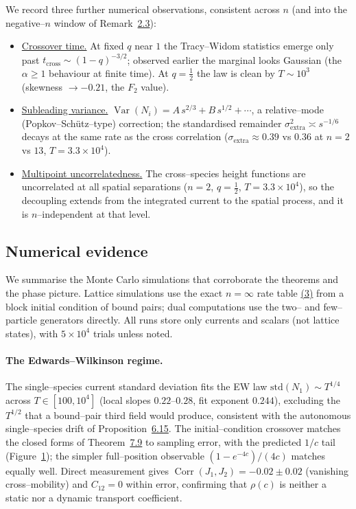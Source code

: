 \documentclass[11pt]{article}
\theoremstyle{plain}
\theoremstyle{definition}
\theoremstyle{remark}
\DeclareMathOperator{\Var}{Var}\DeclareMathOperator{\Cov}{Cov}
\DeclareMathOperator{\Corr}{Corr}\DeclareMathOperator{\cum}{cum}
\begin{document}
We record three further numerical observations, consistent across $n$ (and into the
negative--$n$ window of Remark~\hyperref[rem_range]{2.3}):
\begin{itemize}
\item \underline{Crossover time.} At fixed $q$ near $1$ the Tracy--Widom statistics emerge only
past $t_{\mathrm{cross}}\sim(1-q)^{-3/2}$; observed earlier the marginal looks Gaussian
(the $\alpha\ge1$ behaviour at finite time). At $q=\tfrac12$ the law is clean by
$T\sim10^3$ (skewness $\to-0.21$, the $F_2$ value).
\item \underline{Subleading variance.} $\Var(N_i)=A\,s^{2/3}+B\,s^{1/2}+\cdots$, a
relative--mode (Popkov--Sch\"utz--type) correction; the standardised remainder
$\sigma_{\mathrm{extra}}^2\asymp s^{-1/6}$ decays at the same rate as the cross
correlation ($\sigma_{\mathrm{extra}}\approx0.39$ vs $0.36$ at $n=2$ vs $13$,
$T=3.3\times10^4$).
\item \underline{Multipoint uncorrelatedness.} The cross--species height functions are
uncorrelated at all spatial separations ($n=2$, $q=\tfrac12$, $T=3.3\times10^4$), so
the decoupling extends from the integrated current to the spatial process, and it is
$n$--independent at that level.
\end{itemize}

\subsection{Numerical evidence}\label{sec_numerics}

We summarise the Monte Carlo simulations that corroborate the theorems and the
phase picture. Lattice simulations use the exact $n=\infty$ rate table \hyperref[eq_rates]{(3)}
from a block initial condition of bound pairs; dual computations use the two-- and
few--particle generators directly. All runs store only currents and scalars (not lattice
states), with $5\times10^4$ trials unless noted.

\paragraph{The Edwards--Wilkinson regime.}
The single--species current standard deviation fits the EW law $\mathrm{std}(N_1)\sim
T^{1/4}$ across $T\in[100,10^4]$ (local slopes $0.22$--$0.28$, fit exponent $0.244$),
excluding the $T^{1/2}$ that a bound--pair third field would produce, consistent with
the autonomous single--species drift of Proposition~\hyperref[prop_drift]{6.15}. The initial--condition crossover matches the closed forms of
Theorem~\hyperref[thm_closed]{7.9} to sampling error, with the predicted $1/c$ tail
(Figure~\hyperref[fig_rho]{1}); the simpler full--position observable $(1-e^{-4c})/(4c)$ matches
equally well. Direct measurement gives $\Corr(J_1,J_2)=-0.02\pm0.02$ (vanishing
cross--mobility) and $C_{12}=0$ within error, confirming that $\rho(c)$ is neither a
static nor a dynamic transport coefficient.
\end{document}
